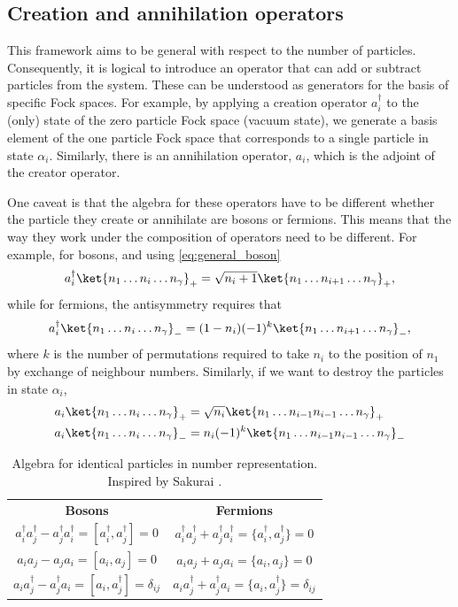 \subsection{Creation and annihilation operators}

This framework aims to be general with respect to the number of particles. Consequently, it is logical to introduce an operator that can add or subtract particles from the system. These can be understood as generators for the basis of specific Fock spaces. For example, by applying a creation operator $a^\dagger_i$ to the (only) state of the zero particle Fock space (vacuum state), we generate a basis element of the one particle Fock space that corresponds to a single particle in state $\alpha_i$. Similarly, there is an annihilation operator, $a_i$, which is the adjoint of the creator operator. 

One caveat is that the algebra for these operators have to be different whether the particle they create or annihilate are bosons or fermions. This means that the way they work under the composition of operators need to be different. For example, for bosons, and using \eqref{eq:general_boson}
\begin{align*}
    a_i^\dagger \ket{n_1 \ldots n_i \ldots n_\gamma}_+ = \sqrt{n_i + 1} \ket{n_1 \ldots n_{i+1} \ldots n_\gamma}_+,
\end{align*}
while for fermions, the antisymmetry requires that
\begin{align*}
    a_i^\dagger \ket{n_1 \ldots n_i \ldots n_\gamma}_- = (1 - n_i)(-1)^k \ket{n_1 \ldots n_{i+1} \ldots n_\gamma}_-,
\end{align*}
where $k$ is the number of permutations required to take $n_i$ to the position of $n_1$ by exchange of neighbour numbers. Similarly, if we want to destroy the particles in state $\alpha_i$, 
\begin{align*}
    a_i \ket{n_1 \ldots n_i \ldots n_\gamma}_+ &= \sqrt{n_i} \ket{n_1 \ldots n_{i-1}n_{i-1} \ldots n_\gamma}_+ \\
        a_i \ket{n_1 \ldots n_i \ldots n_\gamma}_- &= n_i(-1)^k \ket{n_1 \ldots n_{i-1}n_{i-1} \ldots n_\gamma}_-
\end{align*}

\begin{table}
    \centering
    \begin{tabular}{cc}
         \textbf{Bosons}& \textbf{Fermions} \\
         $a_i^\dagger a_j^\dagger  - a_j^\dagger a_i^\dagger  = [a_i^\dagger , a_j^\dagger ]=0$& $a_i^\dagger a_j^\dagger + a_j^\dagger a_i^\dagger  = \{a_i^\dagger , a_j^\dagger\} =0$ \\
         $a_ia_j - a_ja_i = [a_i, a_j]=0$& $a_ia_j + a_ja_i = \{a_i, a_j\}=0$ \\
         $a_ia_j^\dagger - a_j^\dagger a_i = [a_i, a_j^\dagger]=\delta_{ij}$ & $a_ia_j^\dagger + a_j^\dagger a_i = \{a_i, a_j^\dagger\}=\delta_{ij}$\\
    \end{tabular}
    \caption{Algebra for identical particles in number representation. Inspired by Sakurai \cite{sakurai2020modern}.}
    \label{tab:operator_algebra}
\end{table}

